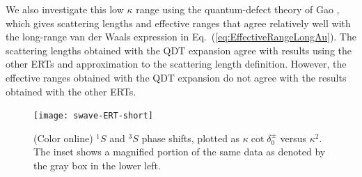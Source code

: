 \documentclass[preprint,showpacs,showkeys,preprintnumbers,amsmath,amssymb,longbibliography,pra,aps]{revtex4-1}
\begin{document}
We also investigate this low $\kappa$ range using the quantum-defect theory 
of Gao \cite{Gao1998}, which gives scattering lengths and effective ranges
that agree relatively well with the long-range van der Waals expression in
Eq.~(\ref{eq:EffectiveRangeLongAu}). The scattering 
lengths obtained with the QDT expansion agree with results using the other 
ERTs and approximation to the scattering length definition. However, the 
effective ranges obtained with the QDT expansion do not agree with the 
results obtained with the other ERTs.


\begin{figure}[H]
	\centering
	\texttt{[image: swave-ERT-short]}
	\caption{(Color online) $^1S$ and $^3S$ phase shifts, plotted as
$\kappa \cot \delta_0^\pm$ versus $\kappa^2$. The inset shows a magnified
portion of the same data as denoted by the gray box in the lower left.}
	\label{fig:swave-ERT-short}
\end{figure}
\end{document}
